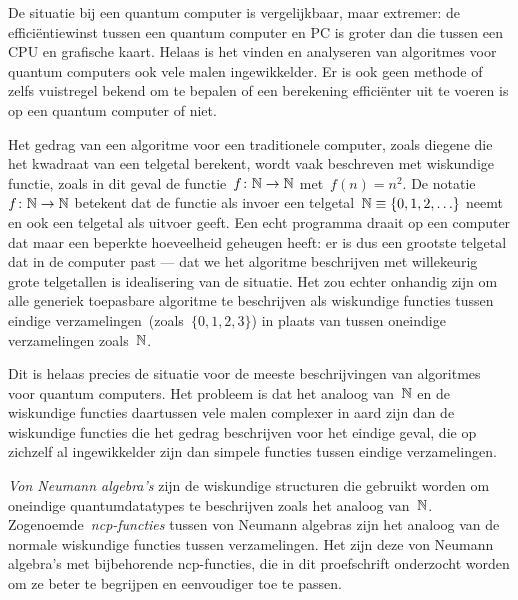 De situatie bij een quantum computer is vergelijkbaar, maar extremer:
    de effici\"entiewinst tussen een quantum computer en PC
    is groter dan die tussen een CPU en grafische kaart.
Helaas is het vinden en analyseren van algoritmes voor quantum computers
    ook vele malen ingewikkelder.
Er is ook geen methode of zelfs vuistregel bekend
    om te bepalen of een berekening effici\"enter uit te voeren
    is op een quantum computer of niet.


Het gedrag van een algoritme voor een traditionele computer,
    zoals diegene die het kwadraat van een telgetal berekent,
    wordt vaak beschreven met wiskundige functie,
    zoals in dit geval de functie~$f\colon \mathbb{N} \to \mathbb{N}$
        met~$f(n) = n^2$.
De notatie~$f\colon \mathbb{N} \to \mathbb{N}$
    betekent dat de functie als invoer
    een telgetal~$\mathbb{N} \equiv \{0, 1, 2, \ldots \}$
    neemt en ook een telgetal als uitvoer geeft.
Een echt programma draait op een computer
    dat maar een beperkte hoeveelheid geheugen heeft:
        er is dus een grootste telgetal dat in de computer past
        --- dat we het algoritme beschrijven
    met willekeurig grote telgetallen is idealisering van de situatie.
Het zou echter onhandig zijn om alle generiek toepasbare algoritme
    te beschrijven als wiskundige functies tussen
    eindige verzamelingen~(zoals~$\{0, 1, 2, 3\}$)
    in plaats van tussen oneindige verzamelingen zoals~$\mathbb{N}$.

Dit is helaas precies de situatie voor de meeste beschrijvingen van
    algoritmes voor quantum computers.
Het probleem is dat het analoog van~$\mathbb{N}$
    en de wiskundige functies daartussen
    vele malen complexer in aard zijn
    dan de wiskundige functies die het gedrag
    beschrijven voor het eindige geval,
    die op zichzelf al ingewikkelder zijn dan
    simpele functies tussen eindige verzamelingen.

\emph{Von Neumann algebra's} zijn de wiskundige structuren
    die gebruikt worden om oneindige quantumdatatypes
    te beschrijven zoals het analoog van~$\mathbb{N}$.
Zogenoemde~\emph{ncp-functies} tussen von Neumann algebras
    zijn het analoog van de normale wiskundige functies
    tussen verzamelingen.
Het zijn deze von Neumann algebra's met bijbehorende
    ncp-functies, die in dit proefschrift onderzocht worden
    om ze beter te begrijpen en eenvoudiger toe te passen.

